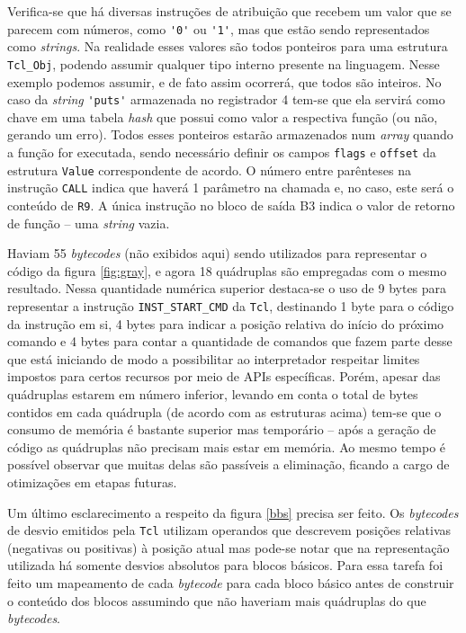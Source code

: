 Verifica-se que há diversas instruções de atribuição que recebem um
valor que se parecem com números, como \verb!'0'! ou \verb!'1'!, mas
que estão sendo representados como \textit{strings}. Na realidade esses valores
são todos ponteiros para uma estrutura \verb!Tcl_Obj!, podendo assumir
qualquer tipo interno presente na linguagem. Nesse exemplo podemos
assumir, e de fato assim ocorrerá, que todos são inteiros. No caso da
\textit{string} \verb!'puts'! armazenada no registrador 4 tem-se que ela
servirá como chave em uma tabela \textit{hash} que possui como valor a
respectiva função (ou não, gerando um erro). Todos esses ponteiros
estarão armazenados num \textit{array} quando a função for executada,
sendo necessário definir os campos \verb!flags! e \verb!offset! da
estrutura \verb!Value! correspondente de acordo.
O número entre parênteses na instrução \verb!CALL!
indica que haverá 1 parâmetro na chamada e, no caso, este será o
conteúdo de \verb!R9!. A única instrução no bloco de saída B3 indica o
valor de retorno de função -- uma \textit{string} vazia.

Haviam 55 \textit{bytecodes} (não exibidos aqui) sendo utilizados para
representar o código da figura \ref{fig:gray}, e agora 18 quádruplas
são empregadas com o mesmo resultado. Nessa quantidade numérica
superior destaca-se o uso de 9 bytes para representar a instrução
\verb!INST_START_CMD! da \texttt{Tcl}, destinando 1 byte para o código
da instrução em si, 4 bytes para indicar a posição relativa do início
do próximo comando e
4 bytes para contar a quantidade de comandos que fazem parte desse que
está iniciando de modo a possibilitar ao  interpretador respeitar
limites impostos para certos recursos por meio de
APIs específicas. Porém, apesar das quádruplas estarem em número inferior,
levando em conta o total de bytes contidos em cada quádrupla (de
acordo com as estruturas acima) tem-se que
o consumo de memória é bastante superior mas temporário -- após
a geração de código as quádruplas não precisam mais estar em memória.
Ao mesmo tempo é possível observar que muitas delas são passíveis a
eliminação, ficando a cargo de otimizações em etapas futuras.

Um último esclarecimento a respeito da figura \ref{bbs} precisa ser feito.
Os \textit{bytecodes} de desvio emitidos pela \texttt{Tcl} utilizam
operandos que descrevem posições relativas (negativas ou positivas) à
posição atual mas pode-se notar que na
representação utilizada há somente desvios absolutos para blocos
básicos. Para essa tarefa foi feito um mapeamento de cada
\textit{bytecode} para cada bloco básico antes de construir o
conteúdo dos blocos assumindo que não haveriam mais quádruplas do que
\textit{bytecodes}.

